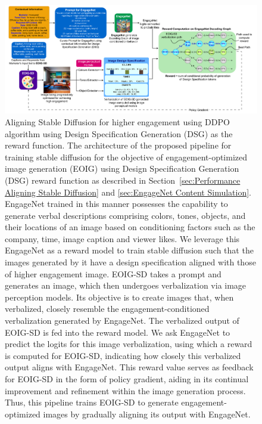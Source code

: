 \begin{landscape}
 \begin{figure}         
         \centering
         \includegraphics[width=1.5\textwidth,scale=1]{images/ddpo_cs_reward_compressed.pdf}
         \caption{\label{fig:architecture_diagram_ddpo_cs_reward} \small
     Aligning Stable Diffusion for higher engagement using DDPO algorithm \cite{black2023training} using Design Specification Generation (DSG) as the reward function. The architecture of the proposed pipeline for training stable diffusion for the objective of engagement-optimized image generation (EOIG) using Design Specification Generation (DSG) reward function as described in Section~\ref{sec:Performance Aligning Stable Diffusion} and \ref{sec:EngageNet Content Simulation}. 
     EngageNet trained in this manner possesses the capability to generate verbal descriptions comprising colors, tones, objects, and their locations of an image based on conditioning factors such as the company, time, image caption and viewer likes. We leverage this EngageNet as a reward model to train stable diffusion such that the images generated by it have a design specification aligned with those of higher engagement image. EOIG-SD takes a prompt and generates an image, which then undergoes verbalization via image perception models. Its objective is to create images that, when verbalized, closely resemble the engagement-conditioned verbalization generated by EngageNet. The verbalized output of EOIG-SD is fed into the reward model. We ask EngageNet to predict the logits for this image verbalization, using which a reward is computed for EOIG-SD, indicating how closely this verbalized output aligns with EngageNet. This reward value serves as feedback for EOIG-SD in the form of policy gradient, aiding in its continual improvement and refinement within the image generation process. Thus, this pipeline trains EOIG-SD to generate engagement-optimized images by gradually aligning its output with EngageNet. 
     }
\end{figure}


\end{landscape}

